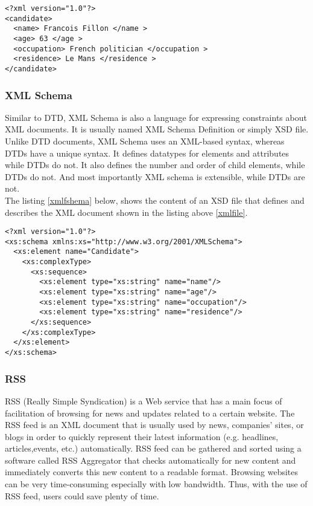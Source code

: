 \begin{lstlisting}[captionpos=b, caption=An example of an XML file, label={xmlfile},
basicstyle=\footnotesize,frame=none]
<?xml version="1.0"?>
<candidate>
  <name> Francois Fillon </name >
  <age> 63 </age >
  <occupation> French politician </occupation >
  <residence> Le Mans </residence >
</candidate>
\end{lstlisting}

\subsubsection{XML Schema}
Similar to DTD, XML Schema \cite{xmlshema} is also a language for expressing constraints about XML documents. It is usually named XML Schema Definition or simply XSD file. Unlike DTD documents, XML Schema uses an XML-based syntax, whereas DTDs have a unique syntax. It defines datatypes for elements and attributes while DTDs do not. It also defines the number and order of child elements, while DTDs do not. And most importantly XML schema is extensible, while DTDs are not.\\
The listing \ref{xmlfshema} below, shows the content of an XSD file that defines and describes the XML document shown in the listing above \ref{xmlfile}. 

\begin{lstlisting}[captionpos=b, caption=An example of a XML Schema file, label={xmlfshema},
basicstyle=\footnotesize,frame=none]
<?xml version="1.0"?>
<xs:schema xmlns:xs="http://www.w3.org/2001/XMLSchema">
  <xs:element name="Candidate">
    <xs:complexType>
      <xs:sequence>
        <xs:element type="xs:string" name="name"/>
        <xs:element type="xs:string" name="age"/>
        <xs:element type="xs:string" name="occupation"/>
        <xs:element type="xs:string" name="residence"/>
      </xs:sequence>
    </xs:complexType>
  </xs:element>
</xs:schema>

\end{lstlisting}

\subsubsection{RSS}

RSS (Really Simple Syndication) \cite{rss} is a Web service that has a main focus of facilitation of browsing for news and updates related to a certain website. The RSS feed is an XML document that is usually used by news, companies' sites, or blogs in order to quickly represent their latest information (e.g. headlines, articles,events, etc.) automatically. RSS feed can be gathered and sorted using a software called RSS Aggregator that checks automatically for new content and immediately converts this new content to a readable format. Browsing websites can be very time-consuming especially with low bandwidth. Thus, with the use of RSS feed, users could save plenty of time.

